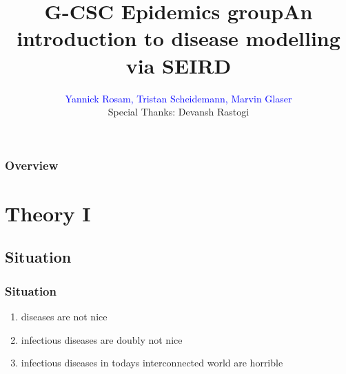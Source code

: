 \documentclass{beamer}
\title[Epidemics Wokrshop]{G-CSC Epidemics group\newline An introduction to disease modelling via SEIRD}
\author{\textcolor{blue}{Yannick Rosam, Tristan Scheidemann, Marvin Glaser\\}
\vspace{2mm}\footnotesize{Special Thanks: Devansh Rastogi}} %
\institute[G-CSC] %
{
Goethe Universtiy Frankfurt - Center for Scientific Computing \\ %
\medskip
}
\begin{document}

\begin{frame}
\titlepage %
\end{frame}


\begin{frame}
\frametitle{Overview} 
\tableofcontents 
\end{frame}




\section{Theory I}

\subsection{Situation}
\begin{frame}
	\frametitle{Situation}
	\begin{enumerate}
		\item diseases are not nice\\\vspace{0.1cm}
	         			

		\item  infectious diseases are doubly not nice \\\vspace{0.1cm}
	       	
                \item infectious diseases in todays interconnected world are horrible	\\\vspace{0.1cm}
         		
	\end{enumerate}
\end{frame}
\end{document}
